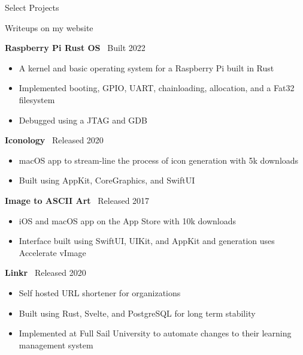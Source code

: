 \documentclass{resume}
\newif\ifisDigital
\begin{document}
\begin{rSection}{Select Projects}

\ifisDigital
\vspace{-1.25em}
\else
Writeups on my website
\fi

\item \textbf{Raspberry Pi Rust OS} \ {Built 2022} 
\ifisDigital\hfill\href{https://github.com/liamrosenfeld/rustos}{Source}\fi
\begin{itemize}
    \itemsep -3pt {}
    \vspace{-0.35em}
    \item A kernel and basic operating system for a Raspberry Pi built in Rust
    \item Implemented booting, GPIO, UART, chainloading, allocation, and a Fat32 filesystem
    \item Debugged using a JTAG and GDB
\end{itemize}

\item \textbf{Iconology} \ {Released 2020} 
\ifisDigital\hfill\href{https://liamrosenfeld.com/projects/iconology}{Writeup}\fi
\begin{itemize}
    \itemsep -3pt {}
    \vspace{-0.35em}
    \item macOS app to stream-line the process of icon generation with 5k downloads
    \item Built using AppKit, CoreGraphics, and SwiftUI
\end{itemize}

\item \textbf{Image to ASCII Art} \ {Released 2017}
\ifisDigital\hfill \href{https://liamrosenfeld.com/projects/ascii-art/}{Writeup}\fi
\begin{itemize}
    \itemsep -3pt {} 
    \vspace{-0.35em}
    \item iOS and macOS app on the App Store with 10k downloads
    \item Interface built using SwiftUI, UIKit, and AppKit and generation uses Accelerate vImage
\end{itemize}

\item \textbf{Linkr} \ {Released 2020}
\ifisDigital\hfill \href{https://liamrosenfeld.com/projects/linkr/}{Writeup}\fi
\begin{itemize}
    \itemsep -3pt {} 
    \vspace{-0.35em}
    \item Self hosted URL shortener for organizations
    \item Built using Rust, Svelte, and PostgreSQL for long term stability
    \item Implemented at Full Sail University to automate changes to their learning management system
\end{itemize}


\end{rSection}
\end{document}
